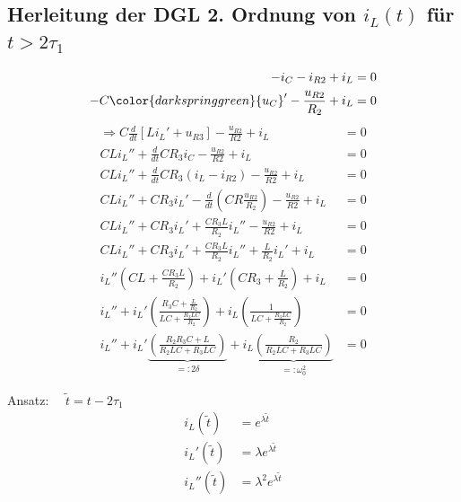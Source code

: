 \documentclass[11pt]{scrartcl}
\begin{document}
\subsection{Herleitung der DGL 2. Ordnung von $i_L(t)$ für $t > 2\tau_1$}%
\begin{align*}
	-i_C - i_{R2} + i_L &= 0 \\
	-C {\color{darkspringgreen}{u_C}}' - \frac{u_{R2}}{R_2} + i_L &= 0 
\end{align*}
{}
\begin{align*}
	\Longrightarrow C \frac{d}{dt} \left[ L i_L' + u_{R3}\right] - \frac{u_{R2}}{R2} + i_L &= 0 \\
	C L i_L'' + \frac{d}{dt} C R_3 i_C - \frac{u_{R2}}{R2} + i_L &= 0 \\
	C L i_L'' + \frac{d}{dt} C R_3 (i_L - i_{R2}) - \frac{u_{R2}}{R2} + i_L &= 0 \\
	C L i_L'' +  C R_3 i_L' - \frac{d}{dt}\left( CR\frac{u_{R2}}{R_2} \right)- \frac{u_{R2}}{R2} + i_L &= 0 \\
	C L i_L'' +  C R_3 i_L' + \frac{CR_3L}{R_2} i_L'' - \frac{u_{R2}}{R2} + i_L &= 0 \\
	C L i_L'' +  C R_3 i_L' + \frac{CR_3L}{R_2} i_L'' + \frac{L}{R_2}i_L' + i_L &= 0 \\
	i_L'' \left( CL + \frac{CR_3L}{R_2} \right) + i_L' \left( CR_3 + \frac{L}{R_2} \right) + i_L &= 0 \\
	i_L'' + i_L' \left(\frac{R_3 C + \frac{L}{R_2} }{L C + \frac{R_3 L C}{R_2} } \right) + i_L \left(\frac{1}{L C +\frac{R_3 L C}{R_2} } \right) &= 0 \\
	i_L'' + i_L' \underbrace{\left( \frac{R_2 R_3 C + L}{R_2 L C + R_3 L C} \right)}_{=: 2\delta} + i_L \underbrace{\left(\frac{R_2}{R_2 L C + R_3 L C} \right)}_{=:\omega_0^2} &= 0
\end{align*}

Ansatz: $\quad \tilde{t} = t-2\tau_{1}$
\begin{align*}
  i_{L}(\tilde{t}) &= e^{\lambda \tilde{t}} \\
  i_{L}'(\tilde{t}) &= \lambda e^{\lambda \tilde{t}} \\
  i_{L}'' (\tilde{t}) &= \lambda^{2} e^{\lambda \tilde{t}}
\end{align*}
\end{document}
